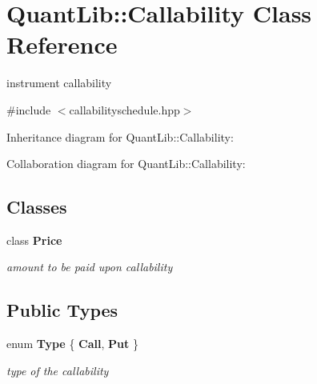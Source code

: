 \section{Quant\+Lib\+:\+:Callability Class Reference}
\label{class_quant_lib_1_1_callability}


instrument callability  




{\ttfamily \#include $<$callabilityschedule.\+hpp$>$}



Inheritance diagram for Quant\+Lib\+:\+:Callability\+:


Collaboration diagram for Quant\+Lib\+:\+:Callability\+:
\subsection*{Classes}
\begin{DoxyCompactItemize}
\item 
class {\bf Price}
\begin{DoxyCompactList}\small\item\em amount to be paid upon callability \end{DoxyCompactList}\end{DoxyCompactItemize}
\subsection*{Public Types}
\begin{DoxyCompactItemize}
\item 
enum {\bf Type} \{ {\bfseries Call}, 
{\bfseries Put}
 \}\label{class_quant_lib_1_1_callability_a81816f4b88f2293c2a193fd4fc17fb4f}
\begin{DoxyCompactList}\small\item\em type of the callability \end{DoxyCompactList}
\end{DoxyCompactItemize}

